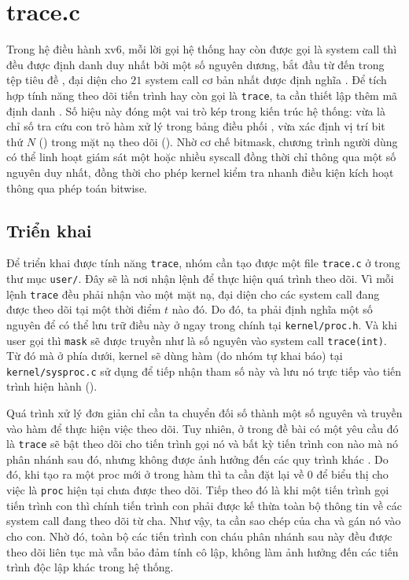 \section{trace.c}
Trong hệ điều hành xv6, mỗi lời gọi hệ thống hay còn được gọi
là system call thì đều được định danh duy nhất bởi một số 
nguyên dương, bắt đầu từ 
 đến  trong tệp tiêu 
đề , đại diện cho $21$ system call 
cơ bản nhất được định nghĩa \cite{hcmus_os_lab2,xv6book}. Để tích hợp tính năng theo dõi tiến 
trình hay còn gọi là \texttt{trace}, ta cần thiết lập thêm mã định 
danh . Số hiệu này đóng một vai trò kép trong 
kiến trúc hệ thống: vừa là chỉ số tra cứu con trỏ hàm xử 
lý trong bảng điều phối , vừa xác định vị 
trí bit thứ $N$ () trong mặt nạ theo dõi 
(). Nhờ cơ chế bitmask, chương trình người
dùng có thể linh hoạt giám sát một hoặc nhiều syscall đồng 
thời chỉ thông qua một số nguyên duy nhất, đồng thời cho phép 
kernel kiểm tra nhanh điều kiện kích hoạt thông qua phép toán bitwise.

\subsection{Triển khai}
Để triển khai được tính năng \texttt{trace}, nhóm cần tạo
được một file \texttt{trace.c} ở trong thư mục \texttt{user/}.
Đây sẽ là nơi nhận lệnh 
để thực hiện quá trình theo dõi. Vì mỗi lệnh \texttt{trace} đều phải nhận 
vào một mặt nạ, đại diện cho các system call đang được theo dõi
tại một thời điểm $t$ nào đó. Do đó, ta phải định nghĩa một số nguyên
để có thể lưu trữ điều này ở ngay trong chính  tại
\texttt{kernel/proc.h}. Và khi user gọi  thì \texttt{mask} 
sẽ được truyền như là số nguyên vào system call \texttt{trace(int)}. Từ
đó mà ở phía dưới, kernel sẽ dùng hàm  (do nhóm tự khai
báo) tại \texttt{kernel/sysproc.c} sử dụng  để tiếp
nhận tham số này và lưu nó trực tiếp vào tiến trình hiện hành
().

Quá trình xử lý đơn giản chỉ cần ta chuyển đối số 
thành một số nguyên và truyền vào hàm  để thực hiện việc 
theo dõi. Tuy nhiên, ở trong đề bài có một yêu cầu đó là \texttt{trace}
sẽ bật theo dõi cho tiến trình gọi nó và bất kỳ tiến trình con nào mà 
nó phân nhánh sau đó, nhưng không được ảnh hưởng đến các quy trình 
khác \cite{hcmus_os_lab2}. Do đó, khi tạo ra một proc mới ở trong hàm
 thì ta cần đặt lại về $0$ để biểu thị cho việc là
\texttt{proc} hiện tại chưa được theo dõi. Tiếp theo đó là khi một tiến 
trình gọi tiến trình con thì chính tiến trình con phải được kế 
thừa toàn bộ thông tin về các system call đang theo dõi từ cha. Như vậy,
ta cần sao chép  của cha và gán nó vào cho con. Nhờ đó,
toàn bộ các tiến trình con cháu phân nhánh sau này đều được theo dõi 
liên tục mà vẫn bảo đảm tính cô lập, không làm ảnh hưởng đến các tiến 
trình độc lập khác trong hệ thống.

